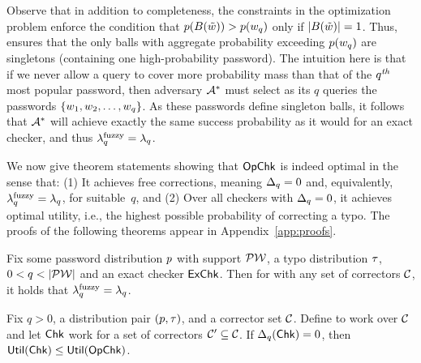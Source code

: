   Observe that in addition to completeness, the constraints in the
  optimization problem enforce the condition that
  $p(B(\tilde{w})) > p({w}_q)$ only if
  $|B(\tilde{w})| = 1$.  Thus, \opchecker ensures that the
  only balls with aggregate probability exceeding $ p({w}_q)$
  are singletons (containing one high-probability password).  The
  intuition here is that if we never allow a query to cover more
  probability mass than that of the $q^{\textit{th}}$ most popular password,
  then adversary $\advA^*$ must select as its $q$ queries the
  passwords $\{{w}_1, {w}_2, \ldots, {w}_q\}$. As these passwords
  define singleton balls, it follows that $\advA^*$ will achieve
  exactly the same success probability as it would for an exact
  checker, and thus $\lambda^\textnormal{fuzzy}_q = \lambda_q$.



We now give theorem statements showing that $\textnormal{\textsf{OpChk}}$ is indeed optimal in
the sense that: (1) It achieves free corrections, meaning $\Delta_q = 0$ and,
equivalently, $\lambda^\textnormal{fuzzy}_q = \lambda_q$, for suitable~$q$, and (2) Over all
checkers with $\Delta_q = 0$, it achieves optimal utility, i.e., the highest
possible probability of correcting a typo. 
The proofs of the following theorems appear in Appendix~\ref{app:proofs}.  

\begin{theorem} Fix some password
  distribution $p$ with support $\mathcal{PW}$, a typo distribution
  $\tau$, $0<q<|\PW|$ and an exact checker $\textnormal{\textsf{ExChk}}$.
Then for \opchecker with any set of correctors ${\mathcal C}$, it 
holds that $\lambda^\textnormal{fuzzy}_q = \lambda_q$. 
\label{thm:free_corr}
\end{theorem}


\begin{theorem} 
Fix $q > 0$, a distribution pair $(p,\tau)$, and a corrector
set ${\mathcal C}$. Define \opchecker to work over ${\mathcal C}$ and let 
$\textnormal{\textsf{Chk}}$ work for a set of correctors ${\mathcal C}' \subseteq {\mathcal C}$. 
If $\Delta_q(\textnormal{\textsf{Chk}}) = 0$, then $\textnormal{\textsf{Util}}(\textnormal{\textsf{Chk}}) \le
\textnormal{\textsf{Util}}(\textnormal{\textsf{OpChk}})$. 
\end{theorem}


